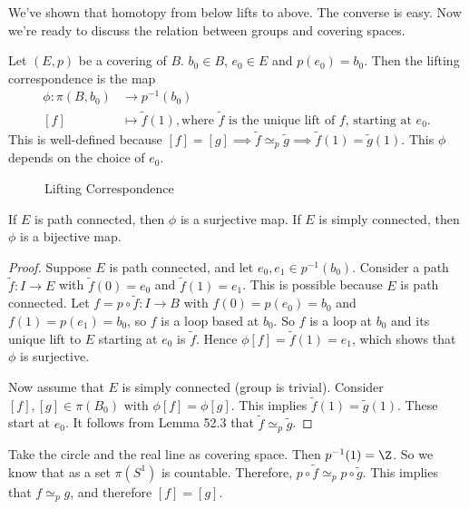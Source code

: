 We've shown that homotopy from below lifts to above.  The converse is easy.
Now we're ready to discuss the relation between groups and covering spaces.

\begin{definition}
    Let $(E, p)$ be a covering of $B$. $b_0 \in B$, $e_0 \in E$ and $p(e_0) = b_0$.
    Then the lifting correspondence is the map  
    \begin{align*}
        \phi: \pi(B, b_0) &\longrightarrow p^{-1}(b_0) \\
        [f]&\longmapsto \tilde f(1), \text{where $\tilde f$ is the unique lift of $f$, starting at $e_0$}
    .\end{align*}
    This is well-defined because $[f] = [g] \implies \tilde f \simeq_p  \tilde g \implies \tilde f(1) = \tilde g(1)$.
    This $\phi$ depends on the choice of $e_0$.
\end{definition}

\begin{figure}[ht]
    \centering
    \caption{Lifting Correspondence}
    \label{fig:lifting-correspondence}
\end{figure}

\begin{theorem}[54.4]
    If $E$ is path connected, then $\phi$ is a surjective map.
    If $E$ is simply connected, then $\phi$ is a bijective map.
\end{theorem}
\begin{proof}
    Suppose $E$ is path connected, and let $e_0, e_1 \in p ^{-1} (b_0)$.
    Consider a path $\tilde f: I \to  E$ with $\tilde f(0) = e_0$ and $\tilde f(1) = e_1$. This is possible because $E$ is path connected.
    Let $f = p  \circ \tilde f: I \to B$ with $f(0) = p(e_0) = b_0$ and $f(1) = p(e_1) = b_0$, so $f$ is a loop based at  $b_0$.
    So $f$ is a loop at $b_0$ and its unique lift to $E$ starting at $e_0$ is $\tilde f$.
    Hence  $\phi[f] = \tilde f(1) = e_1$,
    which shows that $\phi$ is surjective.

    Now assume that $E$ is simply connected (group is trivial).
    Consider $[f], [g] \in \pi(B_0)$ with $\phi[f] = \phi[g]$.
    This implies  $\tilde f(1) = \tilde g(1)$.
    These start at $e_0$.
    It follows from Lemma 52.3 that $\tilde f \simeq_p \tilde g$.
\end{proof}

\begin{eg}
    Take the circle and the real line as covering space. Then $p ^{-1}(1) = \Z$.
    So we know that as a set $\pi(S^{1})$ is countable.
    Therefore, $p  \circ  \tilde f \simeq_p p  \circ  \tilde g $.
    This implies that $f \simeq_p  g$, and therefore $[f] = [g]$.
\end{eg}

